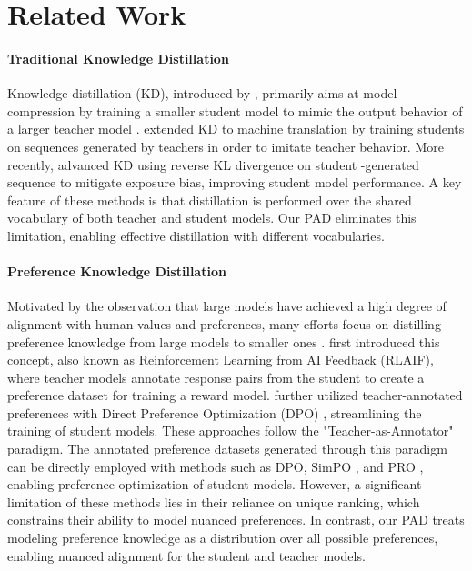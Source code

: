 \section{Related Work}

\paragraph{Traditional Knowledge Distillation}
Knowledge distillation (KD), introduced by \citet{hinton2015distill}, primarily aims at model compression by training a smaller student model to mimic the output behavior of a larger teacher model \citep{kim-rush-2016-sequence, liang-2021-mixkd, zhang-2023-blindly, gu-2024-minillm, agarwal2024onpolicy}.
\citet{kim-rush-2016-sequence} extended KD to machine translation by training students on sequences generated by teachers in order to imitate teacher behavior. More recently, \citet{gu-2024-minillm} advanced KD using reverse KL divergence on student -generated sequence to mitigate exposure bias, improving student model performance. A key feature of these methods is that distillation is performed over the shared vocabulary of both teacher and student models. Our PAD eliminates this limitation, enabling effective distillation with different vocabularies.

\paragraph{Preference Knowledge Distillation}
Motivated by the observation that large models have achieved a high degree of alignment with human values and preferences, many efforts focus on distilling preference knowledge from large models to smaller ones \citep{bai-2022-constitutional, cui2023ultrafeedback, lee-2024-rlaif, yuan-2024-selfreward, tunstall-2024-zephyr, yang2024rlcd}. \citet{bai-2022-constitutional} first introduced this concept, also known as Reinforcement Learning from AI Feedback (RLAIF), where teacher models annotate response pairs from the student to create a preference dataset for training a reward model. \citet{tunstall-2024-zephyr} further utilized teacher-annotated preferences with Direct Preference Optimization (DPO) \citep{rafailov-2023-direct}, streamlining the training of student models.  These approaches follow the "Teacher-as-Annotator" paradigm. The annotated preference datasets generated through this paradigm can be directly employed with methods such as DPO, SimPO \citep{meng-2024-simpo}, and PRO \citep{song-2024-pro}, enabling preference optimization of student models. However, a significant limitation of these methods lies in their reliance on unique ranking, which constrains their ability to model nuanced preferences. In contrast, our PAD treats modeling preference knowledge as a distribution over all possible preferences, enabling nuanced alignment for the student and teacher models.
